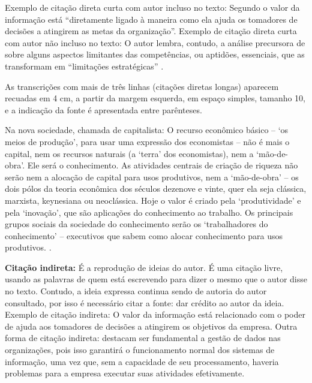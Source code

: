 Exemplo de citação direta curta com autor incluso no texto: Segundo  o valor da informação está “diretamente ligado à maneira como ela ajuda os tomadores de decisões a atingirem as metas da organização”. Exemplo de citação direta curta com autor não incluso no texto: O autor lembra, contudo, a análise precursora de  sobre alguns aspectos limitantes das competências, ou aptidões, essenciais, que as transformam em “limitações estratégicas” \cite{Pressman2009}.

As transcrições com mais de três linhas (citações diretas longas) aparecem recuadas em 4 cm, a partir da margem esquerda, em espaço simples, tamanho 10, e a indicação da fonte é apresentada entre parênteses. 

\begin{citacao}
Na nova sociedade, chamada de capitalista: O recurso econômico básico – ‘os meios de produção’, para usar uma expressão dos economistas – não é mais o capital, nem os recursos naturais (a ‘terra’ dos economistas), nem a ‘mão-de-obra’. Ele será o conhecimento. As atividades centrais de criação de riqueza não serão nem a alocação de capital para usos produtivos, nem a ‘mão-de-obra’ – os dois pólos da teoria econômica dos séculos dezenove e vinte, quer ela seja clássica, marxista, keynesiana ou neoclássica. Hoje o valor é criado pela ‘produtividade’ e pela ‘inovação’, que são aplicações do conhecimento ao trabalho. Os principais grupos sociais da sociedade do conhecimento serão os ‘trabalhadores do conhecimento’ – executivos que sabem como alocar conhecimento para usos produtivos. \cite[p. 48]{Pressman2009}.
\end{citacao}

\textbf{Citação indireta:} É a reprodução de ideias do autor. É uma citação livre, usando as palavras de quem está escrevendo para dizer o mesmo que o autor disse no texto. Contudo, a ideia expressa continua sendo de autoria do autor consultado, por isso é necessário citar a fonte: dar crédito ao autor da ideia. Exemplo de citação indireta: O valor da informação está relacionado com o poder de ajuda aos tomadores de decisões a atingirem os objetivos da empresa\cite{Pressman2009}. Outra forma de citação indireta:  destacam ser fundamental a gestão de dados nas organizações, pois isso garantirá o funcionamento normal dos sistemas de informação, uma vez que, sem a capacidade de seu processamento, haveria problemas para a empresa executar suas atividades efetivamente.

